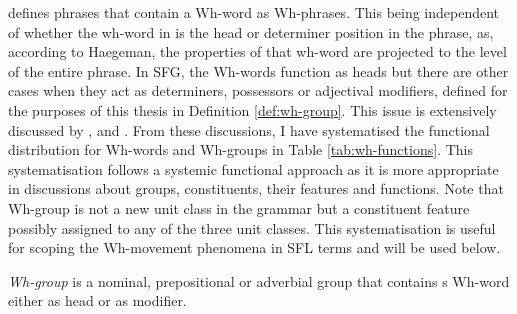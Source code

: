    \citet[374]{Haegeman1991} defines phrases that contain a Wh-word as Wh-phrases. This being independent of whether the wh-word in is the head or determiner position in the phrase, as, according to Haegeman, the properties of that wh-word are projected to the level of the entire phrase. In SFG, the Wh-words function as heads but there are other cases when they act as determiners, possessors or adjectival modifiers, defined for the purposes of this thesis in Definition \ref{def:wh-group}. This issue is extensively discussed by \citet{Abney1987}, \citet{Quirk1985} and \citet{Halliday2013}. From these discussions, I have systematised the functional distribution for Wh-words and Wh-groups in Table \ref{tab:wh-functions}. This systematisation follows a systemic functional approach as it is more appropriate in discussions about groups, constituents, their features and functions. Note that Wh-group is not a new unit class in the grammar but a constituent feature possibly assigned to any of the three unit classes. This systematisation is useful for scoping the Wh-movement phenomena in SFL terms and will be used below.

    \begin{definition}[Wh-group]\label{def:wh-group}
        \textit{Wh-group} is a nominal, prepositional or adverbial group that contains s Wh-word either as head or as modifier. 
    \end{definition}

    \begin{table}[!ht]
        \caption{Functions and features of Wh-words and groups}
        \label{tab:wh-functions}
    \end{table}

